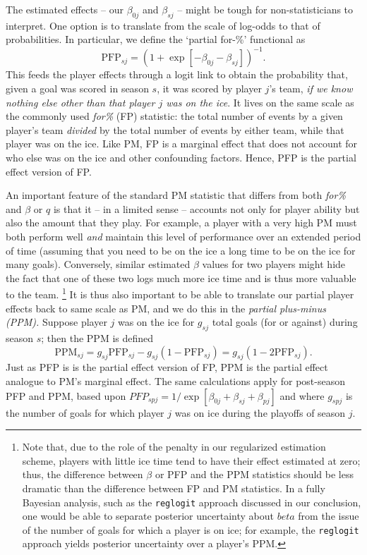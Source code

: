 The estimated effects -- our $\beta_{0j}$ and $\beta_{sj}$ -- might be tough for
non-statisticians to interpret. One option is to translate from the scale of
log-odds to that of probabilities. In particular, we define the `partial for-\%' functional as
\begin{equation}\label{eq:pfp}
\text{PFP}_{sj} = \left(1 + \exp[-\beta_{0j} - \beta_{sj}]\right)^{-1}.
\end{equation}
This feeds the player effects through a logit link  to obtain  the
probability that, given a goal was scored in season $s$, it was scored by
player $j$'s team, {\it if we know nothing else other than that player $j$ was
on the ice}. It lives on the same scale as the commonly used \textit{for\%}
(FP) statistic: the total number of events by a given player's team
\textit{divided} by the total number of events by either team, while that
player was on the ice.   Like PM, FP is a marginal effect that does not
account for who else was on the ice and other confounding factors.  Hence, PFP
is the partial effect version of FP.

An important feature of the standard PM statistic that differs from both
\textit{for\%} and $\beta$ or $q$ is that it -- in a limited sense -- accounts
not only for player ability but also the amount that they play.  For example,
a player with a very high PM must both perform well \textit{and} maintain this
level of performance over an extended period of time (assuming that you need
to be on the ice a long time to be on the ice for many goals).  Conversely,
similar estimated $\beta$ values for two players might hide the fact that one
of these two logs much more ice time and is thus more valuable to the team.
\footnote{Note that, due to the role of the penalty in our regularized estimation scheme, 
players with little ice time tend to have their effect estimated at zero; thus, the difference between $\beta$ or PFP and the PPM statistics should be less dramatic than the difference between FP and PM statistics. In a fully Bayesian analysis, such as the {\tt reglogit} approach discussed in our conclusion, one would be able to separate posterior uncertainty about $beta$ from the issue of the number of goals for which a player is on ice; for example, the {\tt reglogit} approach yields posterior uncertainty over a player's PPM.}  It is thus also important to be able to translate our partial player effects back to same scale as PM, and we do this in the {\em partial plus-minus (PPM).}
Suppose player $j$ was on the ice for $g_{sj}$ total goals (for or against) during season $s$; then the PPM is defined
\begin{equation}\label{eq:ppm}
 \text{PPM}_{sj} = g_{sj}\text{PFP}_{sj} - g_{sj}(1-\text{PFP}_{sj}) = g_{sj}(1 - 2\text{PFP}_{sj}).
 \end{equation} 
 Just as PFP is is the partial effect version of FP, PPM is the partial
effect analogue to PM's marginal effect.  The same calculations apply for 
post-season PFP and PPM, based upon $PFP_{spj} = 1/\exp[\beta_{0j} + \beta_{sj}+
\beta_{pj}]$ and where $g_{spj}$ is the number of goals for which player $j$
was on ice during the playoffs of season $j$.

